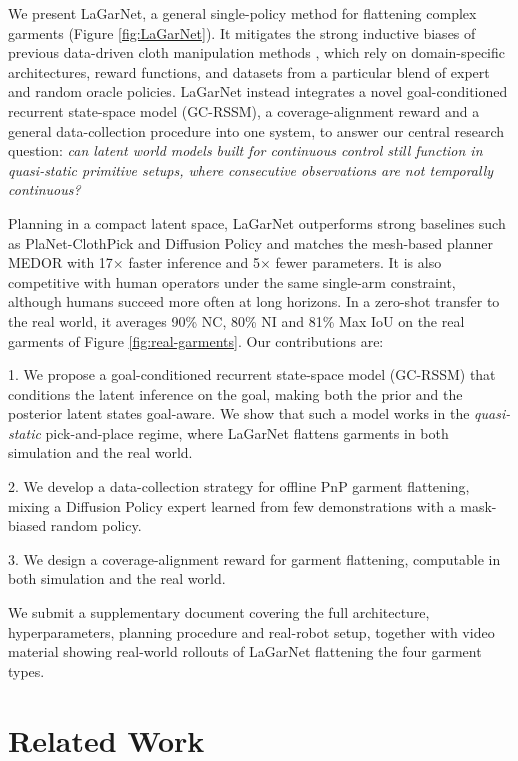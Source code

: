 \documentclass[journal]{IEEEtran}
\newif\ifshowrev\showrevtrue
\newcommand{\rev}[1]{\ifshowrev\textcolor{revblue}{#1}\else#1\fi}
\newif\ifshowirev\showirevtrue
\newcommand{\irev}[1]{\ifshowirev\textcolor{irevgreen}{#1}\else#1\fi}
\newif\ifshowrrev\showrrevtrue
\newcommand{\rrev}[1]{\ifshowrrev\textcolor{rrevred}{#1}\else#1\fi}
\begin{document}
We present LaGarNet, a general single-policy method for flattening complex garments (Figure \ref{fig:LaGarNet}). \rev{It mitigates the strong inductive biases of previous data-driven cloth manipulation methods \cite{kadi2025draper, weng2022fabricflownet, hoque2022visuospatial}, which rely on domain-specific architectures, reward functions, and datasets from a particular blend of expert and random oracle policies. LaGarNet instead integrates a \irev{novel} goal-conditioned recurrent state-space model (GC-RSSM), a coverage-alignment reward and a general data-collection procedure into one system, to answer our central research question: \textit{can latent world models built for continuous control still function in quasi-static primitive setups, where consecutive observations are not temporally continuous?}}

\rrev{Planning in a compact latent space, LaGarNet} outperforms strong baselines such as PlaNet-ClothPick \cite{kadi2024planet} and Diffusion Policy \cite{chi2023diffusionpolicy} and matches the mesh-based planner MEDOR \cite{huang2022mesh} with 17$\times$ faster inference and 5$\times$ fewer parameters. It is also competitive with human operators under the same single-arm constraint, although humans succeed more often at long horizons. \irev{In a zero-shot transfer to the real world}, it averages 90\% NC, 80\% NI and 81\% Max IoU on the real garments of Figure \ref{fig:real-garments}. Our contributions are:

1. \rev{We propose a goal-conditioned recurrent state-space model (GC-RSSM) that conditions the latent inference on the goal, making both the prior and the posterior latent states goal-aware. We show that such a model works in the \emph{quasi-static} pick-and-place regime, where LaGarNet flattens garments in both simulation and the real world.}

2. \rev{We develop a data-collection strategy for offline PnP garment flattening, mixing a Diffusion Policy expert learned from few demonstrations with a mask-biased random policy.}

3. \rev{We design a coverage-alignment reward for garment flattening, computable in both simulation and the real world.}

\rev{We submit a supplementary document covering the full architecture, hyperparameters, planning procedure and real-robot setup, together with video material showing real-world rollouts of LaGarNet flattening the four garment types.}

\section{Related Work} \label{sec:related-work}
\end{document}
